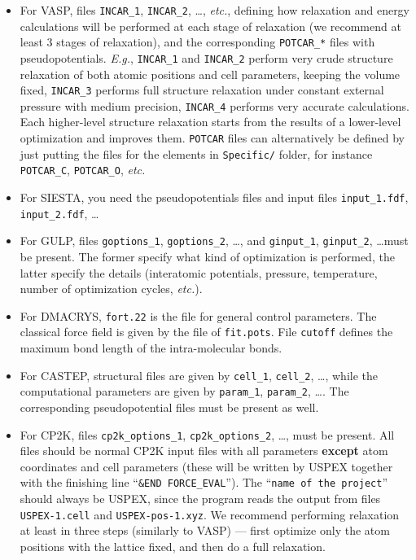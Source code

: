\documentclass[12pt]{article}
\newcommand{\file}[1]{\texttt{#1}}
\begin{document}
\begin{itemize}
\item For VASP, files \file{INCAR\_1}, \file{INCAR\_2}, \ldots, \emph{etc.},
defining how relaxation and energy calculations will be performed at each stage
of relaxation (we recommend at least 3 stages of relaxation), and the
corresponding \file{POTCAR\_*} files with pseudopotentials. \emph{E.g.},
\file{INCAR\_1} and \file{INCAR\_2} perform very crude structure relaxation of
both atomic positions and cell parameters, keeping the volume fixed,
\file{INCAR\_3} performs full structure relaxation under constant external
pressure with medium precision, \file{INCAR\_4} performs very accurate
calculations. Each higher-level structure relaxation starts from the results of
a lower-level optimization and improves them. \file{POTCAR} files can
alternatively be defined by just putting the files for the elements in
\file{Specific/} folder, for instance \file{POTCAR\_C}, \file{POTCAR\_O},
\emph{etc.}

\item For SIESTA, you need the pseudopotentials files and input files
\file{input\_1.fdf}, \\ \file{input\_2.fdf}, \ldots

\item For GULP, files \file{goptions\_1}, \file{goptions\_2}, \ldots, and
\file{ginput\_1}, \file{ginput\_2}, \ldots must be present. The former specify
what kind of optimization is performed, the latter specify the details
(interatomic potentials, pressure, temperature, number of optimization cycles,
\emph{etc.}).

\item For DMACRYS, \file{fort.22} is the file for general control parameters.
The classical force field is given by the file of \file{fit.pots}. File
\file{cutoff} defines the maximum bond length of the intra-molecular bonds.

\item For CASTEP, structural files are given by \file{cell\_1}, \file{cell\_2},
\ldots, while the computational parameters are given by \file{param\_1},
\file{param\_2}, \ldots. The corresponding pseudopotential files must be present
as well.

\item For CP2K, files \file{cp2k\_options\_1}, \file{cp2k\_options\_2}, \ldots,
must be present. All files should be normal CP2K input files with all parameters
\textbf{except} atom coordinates and cell parameters (these will be written by
USPEX together with the finishing line ``\texttt{\&END FORCE\_EVAL}''). The
``\texttt{name of the project}'' should always be USPEX, since the program reads
the output from files \file{USPEX-1.cell} and \file{USPEX-pos-1.xyz}. We
recommend performing relaxation at least in three steps (similarly to VASP) ---
first optimize only the atom positions with the lattice fixed, and then do a
full relaxation.


\end{itemize}
\end{document}

